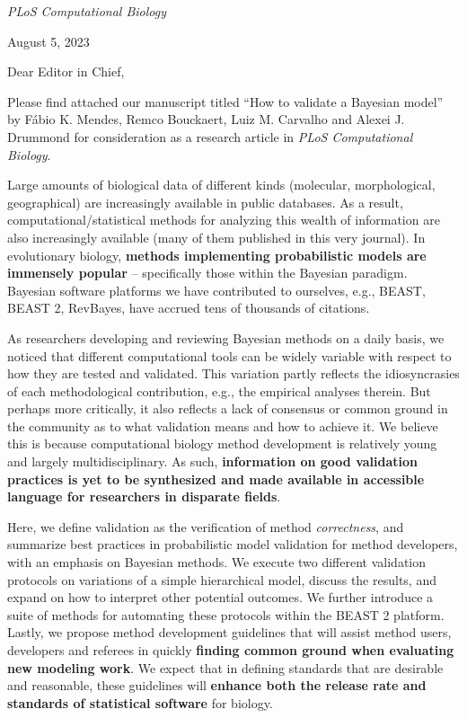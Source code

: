\documentclass[12pt,a4paper]{article}
\begin{document}
\onehalfspacing
\emph{PLoS Computational Biology}

\begin{flushright}
August 5, 2023
\end{flushright}

Dear Editor in Chief,

\vspace{0.25cm}

Please find attached our manuscript titled ``How to validate a Bayesian model'' by F\'{a}bio K. Mendes, Remco Bouckaert, Luiz M. Carvalho and Alexei J. Drummond for consideration as a research article in \emph{PLoS Computational Biology}.

\vspace{0.25cm}

Large amounts of biological data of different kinds (molecular, morphological, geographical) are increasingly available in public databases.
As a result, computational/statistical methods for analyzing this wealth of information are also increasingly available (many of them published in this very journal).
In evolutionary biology, \textbf{methods implementing probabilistic
  models are immensely popular} -- specifically those within the Bayesian paradigm. %
Bayesian software platforms we have contributed to ourselves, e.g., BEAST, BEAST 2, RevBayes, have accrued tens of thousands of citations.

\vspace{0.25cm}

As researchers developing and reviewing Bayesian methods on a daily basis, we noticed that different computational tools can be widely variable with respect to how they are tested and validated.
This variation partly reflects the idiosyncrasies of each methodological contribution, e.g., the empirical analyses therein.
But perhaps more critically, it also reflects a lack of consensus or common ground in the community as to what validation means and how to achieve it.
We believe this is because computational biology method development is relatively young and largely multidisciplinary.
As such, \textbf{information on good validation practices is yet to be synthesized and made available in accessible language for researchers in disparate fields}.

\vspace{0.25cm}

Here, we define validation as the verification of method \emph{correctness}, and summarize best practices in probabilistic model validation for method developers, with an emphasis on Bayesian methods.
We execute two different validation protocols on variations of a simple hierarchical model, discuss the results, and expand on how to interpret other potential outcomes.
We further introduce a suite of methods for automating these protocols within the BEAST 2 platform.
Lastly, we propose method development guidelines that will assist method users, developers and referees in quickly \textbf{finding common ground when evaluating new modeling work}.
We expect that in defining standards that are desirable and reasonable, these guidelines will \textbf{enhance both the release rate and standards of statistical software} for biology.
\end{document}
